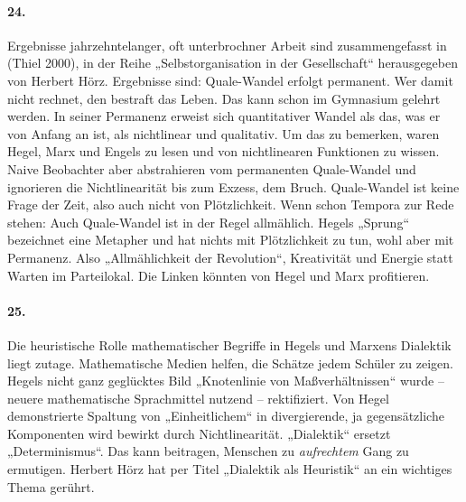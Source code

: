 \documentclass[a4paper,11pt]{article}
\begin{document}
\paragraph{24.}
Ergebnisse jahrzehntelanger, oft unterbrochner Arbeit sind zusammengefasst in
(Thiel 2000), in der Reihe „Selbstorganisation in der Gesellschaft“
herausgegeben von Herbert Hörz.  Ergebnisse sind: Quale-Wandel erfolgt
permanent.  Wer damit nicht rechnet, den bestraft das Leben. Das kann schon im
Gymnasium gelehrt werden. In seiner Permanenz erweist sich quantitativer
Wandel als das, was er von Anfang an ist, als nichtlinear und qualitativ. Um
das zu bemerken, waren Hegel, Marx und Engels zu lesen und von nichtlinearen
Funktionen zu wissen. Naive Beobachter aber abstrahieren vom permanenten
Quale-Wandel und ignorieren die Nichtlinearität bis zum Exzess, dem Bruch.
Quale-Wandel ist keine Frage der Zeit, also auch nicht von Plötzlichkeit. Wenn
schon Tempora zur Rede stehen: Auch Quale-Wandel ist in der Regel allmählich.
Hegels „Sprung“ bezeichnet eine Metapher und hat nichts mit Plötzlichkeit zu
tun, wohl aber mit Permanenz. Also „Allmählichkeit der Revolution“,
Kreativität und Energie statt Warten im Parteilokal. Die Linken könnten von
Hegel und Marx profitieren.

\paragraph{25.}
Die heuristische Rolle mathematischer Begriffe in Hegels und Marxens Dialektik
liegt zutage. Mathematische Medien helfen, die Schätze jedem Schüler zu
zeigen.  Hegels nicht ganz geglücktes Bild „Knotenlinie von Maßverhältnissen“
wurde – neuere mathematische Sprachmittel nutzend -- rektifiziert. Von Hegel
demonstrierte Spaltung von „Einheitlichem“ in divergierende, ja gegensätzliche
Komponenten wird bewirkt durch Nichtlinearität.  „Dialektik“ ersetzt
„Determinismus“. Das kann beitragen, Menschen zu \emph{aufrechtem} Gang zu
ermutigen. Herbert Hörz hat per Titel „Dialektik als Heuristik“ an ein
wichtiges Thema gerührt.
\end{document}
